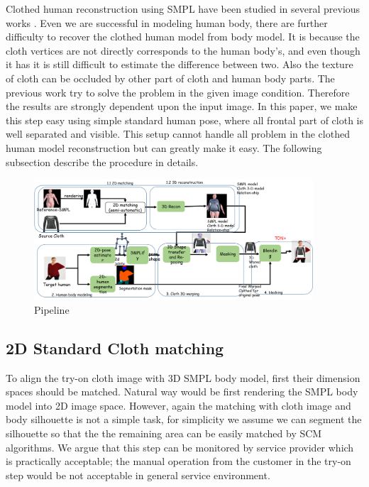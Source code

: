 Clothed human reconstruction using SMPL have been studied in several previous works \cite{Weng2018PhotoW3,Zanfir2018HumanAT}.
Even we are successful in modeling human body, there are further difficulty to recover the clothed human model from body model. It is because the cloth vertices are not directly corresponds to the human body's, and even though it has it is still difficult to estimate the difference between two. Also the texture of cloth can be occluded by other part of cloth and human body parts. The previous work try to solve the problem in the given image condition. Therefore the results are strongly dependent upon the input image.
In this paper, we make this step easy using simple standard human pose, where all frontal part of cloth is well separated and visible. This setup cannot handle all problem in the clothed human model reconstruction but can greatly make it easy.   
The following subsection describe the procedure in details.


\begin{figure}
\centering
\includegraphics[height=4.5cm, scale=1]{figures/pipeline.png}   %
\caption{Pipeline}
\label{fig:piepline}
\end{figure}

\subsection{2D Standard Cloth matching}


To align the try-on cloth image with 3D SMPL body model\cite{Loper2015SMPLAS}, first their dimension spaces should be matched. Natural way would be first rendering the SMPL body model into 2D image space. However, again the matching with cloth image and body silhouette is not a simple task, for simplicity we assume we can segment the silhouette so that the the remaining area can be easily matched by SCM algorithms. We argue that this step can be monitored by service provider which is practically acceptable; the manual operation from the customer in the try-on step would be not acceptable in general service environment.   

